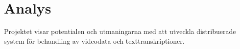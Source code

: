 \chapter{Analys}
Projektet visar potentialen och utmaningarna med att utveckla distribuerade system för behandling av videodata och texttranskriptioner.
